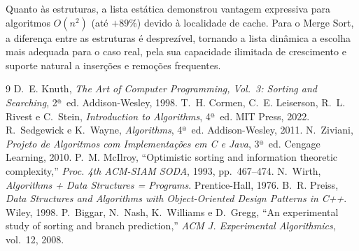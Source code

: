 \documentclass[conference]{IEEEtran}
\begin{document}
Quanto às estruturas, a lista estática demonstrou vantagem expressiva para
algoritmos $O(n^{2})$ (até $+89\%$) devido à localidade de cache.
Para o Merge Sort, a diferença entre as estruturas é desprezível, tornando
a lista dinâmica a escolha mais adequada para o caso real, pela sua
capacidade ilimitada de crescimento e suporte natural a inserções e remoções
frequentes.

\begin{thebibliography}{9}
D.~E. Knuth, \textit{The Art of Computer Programming, Vol.~3: Sorting and
Searching}, 2ª~ed. Addison-Wesley, 1998.
T.~H. Cormen, C.~E. Leiserson, R.~L. Rivest e C.~Stein,
\textit{Introduction to Algorithms}, 4ª~ed. MIT Press, 2022.
R.~Sedgewick e K.~Wayne, \textit{Algorithms}, 4ª~ed. Addison-Wesley, 2011.
N.~Ziviani, \textit{Projeto de Algoritmos com Implementações em C e Java},
3ª~ed. Cengage Learning, 2010.
P.~M. McIlroy, ``Optimistic sorting and information theoretic complexity,''
\textit{Proc. 4th ACM-SIAM SODA}, 1993, pp.~467--474.
N.~Wirth, \textit{Algorithms + Data Structures = Programs}.
Prentice-Hall, 1976.
B.~R. Preiss, \textit{Data Structures and Algorithms with Object-Oriented
Design Patterns in C++}. Wiley, 1998.
P.~Biggar, N.~Nash, K.~Williams e D.~Gregg, ``An experimental study of
sorting and branch prediction,'' \textit{ACM J. Experimental Algorithmics},
vol.~12, 2008.
\end{thebibliography}
\end{document}
